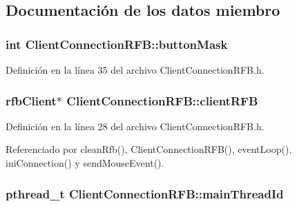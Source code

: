 \subsection{Documentación de los datos miembro}
\hypertarget{classClientConnectionRFB_a716c3e543a42d2eb9163d831d7f7d9c0}{
\subsubsection[{button\-Mask}]{\setlength{\rightskip}{0pt plus 5cm}int Client\-Connection\-R\-F\-B\-::button\-Mask\hspace{0.3cm}{\ttfamily [private]}}}\label{classClientConnectionRFB_a716c3e543a42d2eb9163d831d7f7d9c0}


Definición en la línea 35 del archivo Client\-Connection\-R\-F\-B.\-h.

\hypertarget{classClientConnectionRFB_a7e3efe49516da3950ca4a8c8084ba872}{
\subsubsection[{client\-R\-F\-B}]{\setlength{\rightskip}{0pt plus 5cm}rfb\-Client$\ast$ Client\-Connection\-R\-F\-B\-::client\-R\-F\-B\hspace{0.3cm}{\ttfamily [private]}}}\label{classClientConnectionRFB_a7e3efe49516da3950ca4a8c8084ba872}


Definición en la línea 28 del archivo Client\-Connection\-R\-F\-B.\-h.



Referenciado por clean\-Rfb(), Client\-Connection\-R\-F\-B(), event\-Loop(), ini\-Connection() y send\-Mouse\-Event().

\hypertarget{classClientConnectionRFB_ace0de911ed81b46a190032fc9d0792e8}{
\subsubsection[{main\-Thread\-Id}]{\setlength{\rightskip}{0pt plus 5cm}pthread\-\_\-t Client\-Connection\-R\-F\-B\-::main\-Thread\-Id\hspace{0.3cm}{\ttfamily [private]}}}\label{classClientConnectionRFB_ace0de911ed81b46a190032fc9d0792e8}


